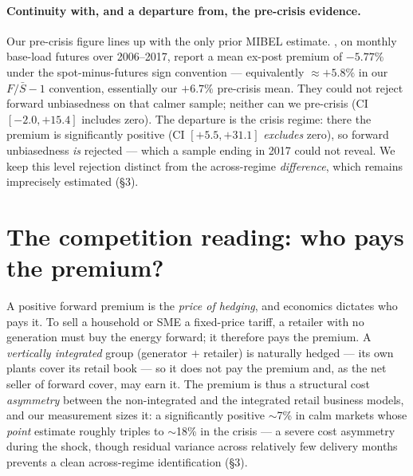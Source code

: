 \documentclass[11pt,a4paper]{article}
\begin{document}
\paragraph{Continuity with, and a departure from, the pre-crisis evidence.} Our
pre-crisis figure lines up with the only prior MIBEL estimate. \citet{ferreira2018},
on monthly base-load futures over 2006--2017, report a mean ex-post premium of
$-5.77\%$ under the \citet{weronzator2014} spot-minus-futures sign convention ---
equivalently $\approx+5.8\%$ in our $F/\bar S-1$ convention, essentially our
$+6.7\%$ pre-crisis mean. They could not reject forward unbiasedness on that calmer
sample; neither can we pre-crisis (CI $[-2.0,+15.4]$ includes zero). The departure
is the crisis regime: there the premium is significantly positive
(CI $[+5.5,+31.1]$ \emph{excludes} zero), so forward unbiasedness \emph{is}
rejected --- which a sample ending in 2017 could not reveal. We keep this level
rejection distinct from the across-regime \emph{difference}, which remains
imprecisely estimated (\S3).

\section{The competition reading: who pays the premium?}

A positive forward premium is the \emph{price of hedging}, and economics dictates
who pays it. To sell a household or SME a fixed-price tariff, a retailer with no
generation must buy the energy forward; it therefore pays the premium. A
\emph{vertically integrated} group (generator $+$ retailer) is naturally hedged ---
its own plants cover its retail book --- so it does not pay the premium and, as the
net seller of forward cover, may earn it. The premium is thus a structural cost
\emph{asymmetry} between the non-integrated and the integrated retail business
models, and our measurement sizes it: a significantly positive $\sim$7\% in calm
markets whose \emph{point} estimate roughly triples to $\sim$18\% in the crisis ---
a severe cost asymmetry during the shock, though residual variance across relatively
few delivery months prevents a clean across-regime identification (\S3).
\end{document}
